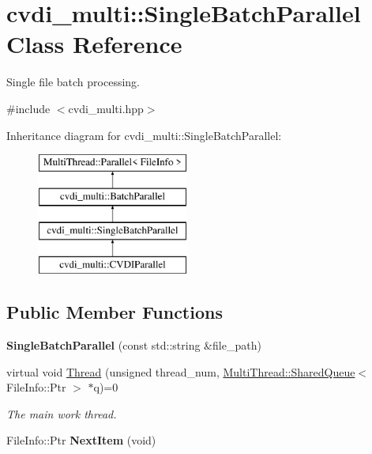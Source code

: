 \hypertarget{classcvdi__multi_1_1SingleBatchParallel}{}\section{cvdi\+\_\+multi\+:\+:Single\+Batch\+Parallel Class Reference}
\label{classcvdi__multi_1_1SingleBatchParallel}


Single file batch processing.  




{\ttfamily \#include $<$cvdi\+\_\+multi.\+hpp$>$}

Inheritance diagram for cvdi\+\_\+multi\+:\+:Single\+Batch\+Parallel\+:\begin{figure}[H]
\begin{center}
\leavevmode
\includegraphics[height=4.000000cm]{classcvdi__multi_1_1SingleBatchParallel}
\end{center}
\end{figure}
\subsection*{Public Member Functions}
\begin{DoxyCompactItemize}
\item 
{\bfseries Single\+Batch\+Parallel} (const std\+::string \&file\+\_\+path)\hypertarget{classcvdi__multi_1_1SingleBatchParallel_ac209a23cedee901482dd96d878f85688}{}\label{classcvdi__multi_1_1SingleBatchParallel_ac209a23cedee901482dd96d878f85688}

\item 
virtual void \hyperlink{classcvdi__multi_1_1SingleBatchParallel_a6514a89e14f2724ab671ffd65d7c43c7}{Thread} (unsigned thread\+\_\+num, \hyperlink{classMultiThread_1_1SharedQueue}{Multi\+Thread\+::\+Shared\+Queue}$<$ File\+Info\+::\+Ptr $>$ $\ast$q)=0
\begin{DoxyCompactList}\small\item\em The main work thread. \end{DoxyCompactList}\item 
File\+Info\+::\+Ptr {\bfseries Next\+Item} (void)\hypertarget{classcvdi__multi_1_1SingleBatchParallel_a26f4c22424a0f3683e9a2f326adba590}{}\label{classcvdi__multi_1_1SingleBatchParallel_a26f4c22424a0f3683e9a2f326adba590}

\end{DoxyCompactItemize}


